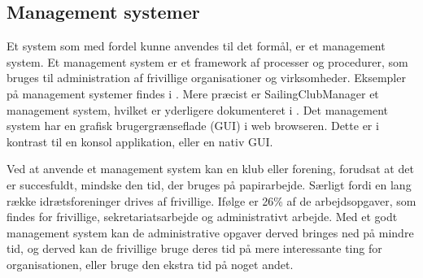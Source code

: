 \subsection{Management systemer}\label{subsec:management-systemer}

Et system som med fordel kunne anvendes til det formål, er et management system. Et management system er et
framework af processer og procedurer, som bruges til administration af frivillige organisationer og
virksomheder. Eksempler på management systemer findes i . Mere præcist er
SailingClubManager et management system, hvilket er yderligere dokumenteret i . Det
management system har en grafisk brugergrænseflade (GUI) i web browseren. Dette er i kontrast til en konsol
applikation, eller en nativ GUI.

Ved at anvende et management system kan en klub eller forening, forudsat at det er succesfuldt, mindske den
tid, der bruges på papirarbejde. Særligt fordi en lang række idrætsforeninger drives af frivillige. Ifølge
\citet{Frivilligrapporten} er 26\% af de arbejdsopgaver, som findes for frivillige, sekretariatsarbejde og
administrativt arbejde. Med et godt management system kan de administrative opgaver derved bringes ned på
mindre tid, og derved kan de frivillige bruge deres tid på mere interessante ting for organisationen, eller
bruge den ekstra tid på noget andet.




